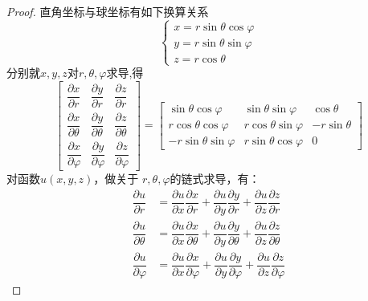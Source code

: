    \begin{proof}
    直角坐标与球坐标有如下换算关系
	\begin{equation}
		\begin{cases}
			x= r\sin \theta \cos \varphi \\
			y= r\sin \theta \sin \varphi \\
			z= r\cos \theta
		\end{cases} 	
	\end{equation}
	分别就$x,y,z$对$r,\theta, \varphi$求导,得
	\begin{equation}\label{eq:laplace5}
	\left[\begin{array}{ccc}
		\dfrac{\partial x}{\partial r} & \dfrac{\partial y}{\partial r} & \dfrac{\partial z}{\partial r}\\ 
		\dfrac{\partial x}{\partial \theta} & \dfrac{\partial y}{\partial \theta} & \dfrac{\partial z}{\partial \theta}  \\ 
		\dfrac{\partial x}{\partial \varphi} & \dfrac{\partial y}{\partial \varphi} & \dfrac{\partial z}{\partial \varphi} 
	\end{array}\right]
	= \left[\begin{array}{ccc}
		\sin \theta \cos \varphi & \sin \theta \sin \varphi & \cos \theta\\ 
		r\cos \theta \cos \varphi & r\cos \theta \sin \varphi  & -r\sin \theta  \\ 
		-r\sin \theta \sin \varphi & r\sin \theta \cos \varphi & 0 
	\end{array}\right]
    \end{equation}
	对函数$u(x,y,z)$，做关于 $r, \theta, \varphi $的链式求导，有：
	$$\begin{aligned}
		\dfrac{\partial {u}}{\partial {r}}&=\dfrac{\partial {u}}{\partial x} \dfrac{\partial {x}}{\partial {r}}+\dfrac{\partial u}{\partial {y}} \dfrac{\partial {y}}{\partial {r}}+\dfrac{\partial u}{\partial z} \dfrac{\partial z}{\partial {r}} \\ 
		\dfrac{\partial {u}}{\partial \theta}&=\dfrac{\partial {u}}{\partial x} \dfrac{\partial{x}}{\partial \theta}+\dfrac{\partial u}{\partial {y}} \dfrac{\partial {y}}{\partial \theta}+\dfrac{\partial{u}}{\partial z} \dfrac{\partial z}{\partial \theta} \\ 
		\dfrac{\partial {u}}{\partial \varphi}&=\dfrac{\partial u}{\partial x} \dfrac{\partial{x}}{\partial \varphi}+\dfrac{\partial u}{\partial y} \dfrac{\partial y}{\partial \varphi}+\dfrac{\partial u}{\partial z} \dfrac{\partial z}{\partial \varphi}
	\end{aligned} $$

\end{proof}
